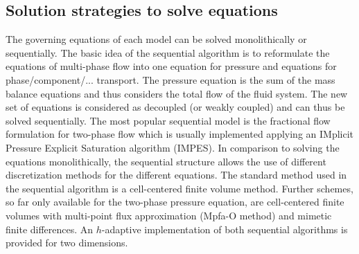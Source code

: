 \subsection{Solution strategies to solve equations}
The governing equations of each model can be solved monolithically or sequentially.
The basic idea of the sequential algorithm is to reformulate the
equations of multi-phase flow into one equation for
pressure and equations for phase/component/... transport. The pressure equation
is the sum of the mass balance equations and thus considers the total flow of the
fluid system. The new set of equations is considered as decoupled (or weakly coupled)
and can thus be solved sequentially. The most popular sequential model is the
fractional flow formulation for two-phase flow which is usually implemented applying
an IMplicit Pressure Explicit Saturation algorithm (IMPES).
In comparison to solving the equations monolithically, the sequential structure allows the use of
different discretization methods for the different equations. The standard method
used in the sequential algorithm is a cell-centered finite volume method. Further schemes,
so far only available for the two-phase pressure equation, are cell-centered finite
volumes with multi-point flux approximation (Mpfa-O method) and mimetic finite differences.
An $h$-adaptive implementation of both sequential algorithms is provided for two dimensions.
